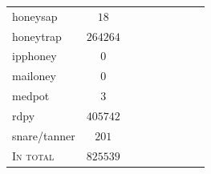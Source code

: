 \begin{table}
\begin{tabularx}{\linewidth}{l|cc|cccccc}
        honeysap \cite{honeysap2021}             & $18$                                  &                                          &                                 &                                    &                 &                     &                 &                     \\
        honeytrap \cite{honeytrap2021}           & $264264$                              &                                          &                                 &                                    &                 &                     &                 &                     \\
        ipphoney \cite{ipphoney2021}             & $0$                                   &                                          &                                 &                                    &                 &                     &                 &                     \\
        mailoney                                 & $0$                                   &                                          &                                 &                                    &                 &                     &                 &                     \\
        medpot \cite{medpot2021}                 & $3$                                   &                                          &                                 &                                    &                 &                     &                 &                     \\
        rdpy \cite{rdpy2021}                     & $405742$                              &                                          &                                 &                                    &                 &                     &                 &                     \\
        snare/tanner \cite{snare2021}            & $201$                                 &                                          &                                 &                                    &                 &                     &                 &                     \\
        \hline                                                                                                                                                                                                                                                                       
        \textsc{In total}                        & $825539$                              &                                          &                                 &                                    &                 &                     &                 &                     \\
        \bottomrule
    \end{tabularx}
    \label{tab:overview-honeypots-attacks}
\end{table}

